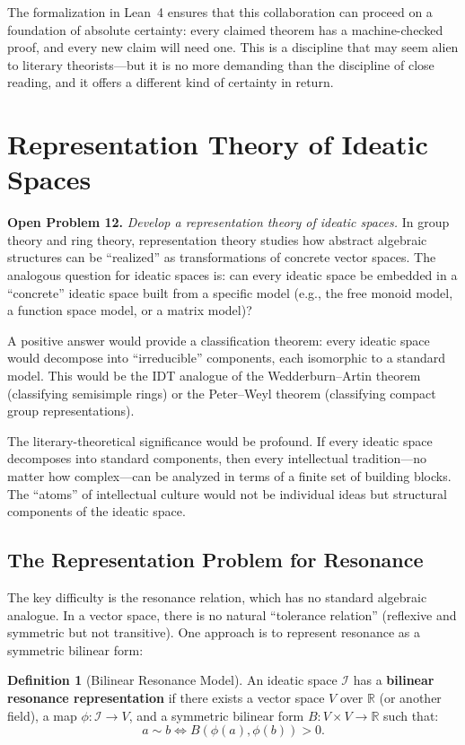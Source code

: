 \documentclass[11pt,openany]{book}
\theoremstyle{definition}
\newtheorem{definition}[axiom]{Definition}
\theoremstyle{plain}
\theoremstyle{remark}
\newcommand{\IS}{\mathcal{I}}               %
\newcommand{\res}{\sim}                      %
\begin{document}
The formalization in Lean~4 ensures that this collaboration can proceed on a foundation of absolute certainty: every claimed theorem has a machine-checked proof, and every new claim will need one. This is a discipline that may seem alien to literary theorists---but it is no more demanding than the discipline of close reading, and it offers a different kind of certainty in return.

\section{Representation Theory of Ideatic Spaces}

\textbf{Open Problem 12.} \emph{Develop a representation theory of ideatic spaces.} In group theory and ring theory, representation theory studies how abstract algebraic structures can be ``realized'' as transformations of concrete vector spaces. The analogous question for ideatic spaces is: can every ideatic space be embedded in a ``concrete'' ideatic space built from a specific model (e.g., the free monoid model, a function space model, or a matrix model)?

A positive answer would provide a classification theorem: every ideatic space would decompose into ``irreducible'' components, each isomorphic to a standard model. This would be the IDT analogue of the Wedderburn--Artin theorem (classifying semisimple rings) or the Peter--Weyl theorem (classifying compact group representations).

The literary-theoretical significance would be profound. If every ideatic space decomposes into standard components, then every intellectual tradition---no matter how complex---can be analyzed in terms of a finite set of building blocks. The ``atoms'' of intellectual culture would not be individual ideas but structural components of the ideatic space.

\subsection{The Representation Problem for Resonance}

The key difficulty is the resonance relation, which has no standard algebraic analogue. In a vector space, there is no natural ``tolerance relation'' (reflexive and symmetric but not transitive). One approach is to represent resonance as a symmetric bilinear form:

\begin{definition}[Bilinear Resonance Model]
An ideatic space $\IS$ has a \textbf{bilinear resonance representation} if there exists a vector space $V$ over $\mathbb{R}$ (or another field), a map $\phi : \IS \to V$, and a symmetric bilinear form $B : V \times V \to \mathbb{R}$ such that:
\[
a \res b \iff B(\phi(a), \phi(b)) > 0.
\]
\end{definition}
\end{document}
